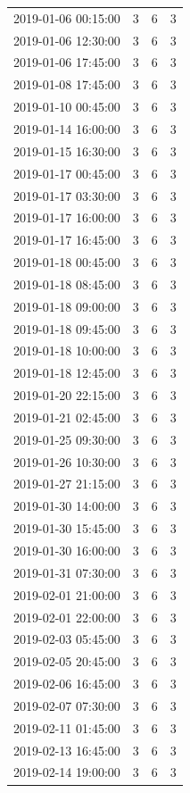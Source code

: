 \begin{tabular}{lrrr}
2019-01-06 00:15:00 & 3 & 6 & 3 \\
2019-01-06 12:30:00 & 3 & 6 & 3 \\
2019-01-06 17:45:00 & 3 & 6 & 3 \\
2019-01-08 17:45:00 & 3 & 6 & 3 \\
2019-01-10 00:45:00 & 3 & 6 & 3 \\
2019-01-14 16:00:00 & 3 & 6 & 3 \\
2019-01-15 16:30:00 & 3 & 6 & 3 \\
2019-01-17 00:45:00 & 3 & 6 & 3 \\
2019-01-17 03:30:00 & 3 & 6 & 3 \\
2019-01-17 16:00:00 & 3 & 6 & 3 \\
2019-01-17 16:45:00 & 3 & 6 & 3 \\
2019-01-18 00:45:00 & 3 & 6 & 3 \\
2019-01-18 08:45:00 & 3 & 6 & 3 \\
2019-01-18 09:00:00 & 3 & 6 & 3 \\
2019-01-18 09:45:00 & 3 & 6 & 3 \\
2019-01-18 10:00:00 & 3 & 6 & 3 \\
2019-01-18 12:45:00 & 3 & 6 & 3 \\
2019-01-20 22:15:00 & 3 & 6 & 3 \\
2019-01-21 02:45:00 & 3 & 6 & 3 \\
2019-01-25 09:30:00 & 3 & 6 & 3 \\
2019-01-26 10:30:00 & 3 & 6 & 3 \\
2019-01-27 21:15:00 & 3 & 6 & 3 \\
2019-01-30 14:00:00 & 3 & 6 & 3 \\
2019-01-30 15:45:00 & 3 & 6 & 3 \\
2019-01-30 16:00:00 & 3 & 6 & 3 \\
2019-01-31 07:30:00 & 3 & 6 & 3 \\
2019-02-01 21:00:00 & 3 & 6 & 3 \\
2019-02-01 22:00:00 & 3 & 6 & 3 \\
2019-02-03 05:45:00 & 3 & 6 & 3 \\
2019-02-05 20:45:00 & 3 & 6 & 3 \\
2019-02-06 16:45:00 & 3 & 6 & 3 \\
2019-02-07 07:30:00 & 3 & 6 & 3 \\
2019-02-11 01:45:00 & 3 & 6 & 3 \\
2019-02-13 16:45:00 & 3 & 6 & 3 \\
2019-02-14 19:00:00 & 3 & 6 & 3 \\

\end{tabular}
